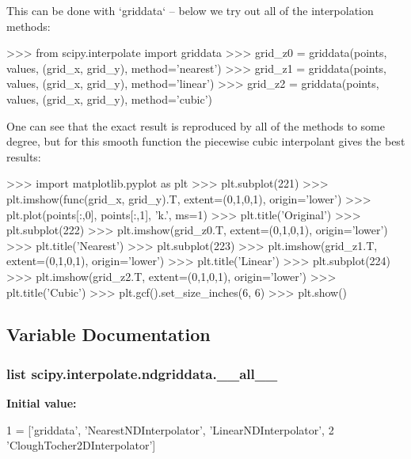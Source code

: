 \begin{DoxyVerb}
This can be done with `griddata` -- below we try out all of the
interpolation methods:

>>> from scipy.interpolate import griddata
>>> grid_z0 = griddata(points, values, (grid_x, grid_y), method='nearest')
>>> grid_z1 = griddata(points, values, (grid_x, grid_y), method='linear')
>>> grid_z2 = griddata(points, values, (grid_x, grid_y), method='cubic')

One can see that the exact result is reproduced by all of the
methods to some degree, but for this smooth function the piecewise
cubic interpolant gives the best results:

>>> import matplotlib.pyplot as plt
>>> plt.subplot(221)
>>> plt.imshow(func(grid_x, grid_y).T, extent=(0,1,0,1), origin='lower')
>>> plt.plot(points[:,0], points[:,1], 'k.', ms=1)
>>> plt.title('Original')
>>> plt.subplot(222)
>>> plt.imshow(grid_z0.T, extent=(0,1,0,1), origin='lower')
>>> plt.title('Nearest')
>>> plt.subplot(223)
>>> plt.imshow(grid_z1.T, extent=(0,1,0,1), origin='lower')
>>> plt.title('Linear')
>>> plt.subplot(224)
>>> plt.imshow(grid_z2.T, extent=(0,1,0,1), origin='lower')
>>> plt.title('Cubic')
>>> plt.gcf().set_size_inches(6, 6)
>>> plt.show()\end{DoxyVerb}
 

\subsection{Variable Documentation}
\hypertarget{namespacescipy_1_1interpolate_1_1ndgriddata_a5936f26badb01747d761062cf6f2a369}{}
\subsubsection[{\+\_\+\+\_\+all\+\_\+\+\_\+}]{\setlength{\rightskip}{0pt plus 5cm}list scipy.\+interpolate.\+ndgriddata.\+\_\+\+\_\+all\+\_\+\+\_\+}\label{namespacescipy_1_1interpolate_1_1ndgriddata_a5936f26badb01747d761062cf6f2a369}
{\bfseries Initial value\+:}
\begin{DoxyCode}
1 = [\textcolor{stringliteral}{'griddata'}, \textcolor{stringliteral}{'NearestNDInterpolator'}, \textcolor{stringliteral}{'LinearNDInterpolator'},
2            \textcolor{stringliteral}{'CloughTocher2DInterpolator'}]
\end{DoxyCode}
